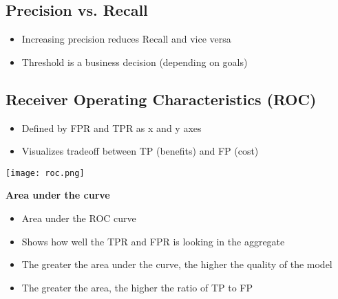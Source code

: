 \subsection{Precision vs. Recall}
\begin{itemize}
    \item Increasing precision reduces Recall and vice versa
    \item Threshold is a business decision (depending on goals)
\end{itemize}

\subsection{Receiver Operating Characteristics (ROC)}
\begin{itemize}
    \item Defined by FPR and TPR as x and y axes
    \item Visualizes tradeoff between TP (benefits) and FP (cost)
\end{itemize}
\begin{center}
    \texttt{[image: roc.png]}
\end{center}
\textbf{Area under the curve}
\begin{itemize}
    \item Area under the ROC curve
    \item Shows how well the TPR and FPR is looking in the aggregate
    \item The greater the area under the curve, the higher the quality of the model
    \item The greater the area, the higher the ratio of TP to FP
\end{itemize}
